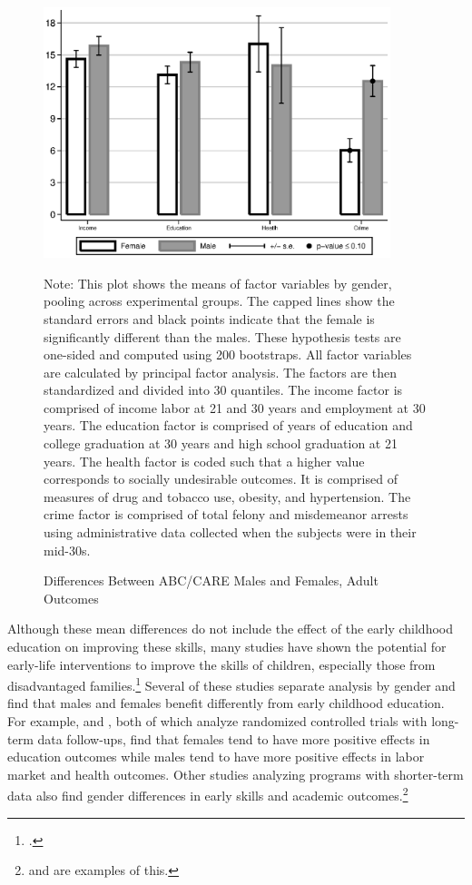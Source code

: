 \begin{figure}[H]
\begin{center}
\caption{Differences Between ABC/CARE Males and Females, Adult Outcomes}
\label{fig:intro-adult-outcomes}
	\includegraphics[width=0.9\textwidth]{../output/abccare-gdiff-adult}
\end{center}
\raggedright \scriptsize
Note: This plot shows the means of factor variables by gender, pooling across experimental groups. The capped lines show the standard errors and black points indicate that the female is significantly different than the males. These hypothesis tests are one-sided and computed using 200 bootstraps. All factor variables are calculated by principal factor analysis. The factors are then standardized and divided into 30 quantiles. The income factor is comprised of income labor at 21 and 30 years and employment at 30 years. The education factor is comprised of years of education and college graduation at 30 years and high school graduation at 21 years. The health factor is coded such that a higher value corresponds to socially undesirable outcomes. It is comprised of measures of drug and tobacco use, obesity, and hypertension. The crime factor is comprised of total felony and misdemeanor arrests using administrative data collected when the subjects were in their mid-30s.
\end{figure}

Although these mean differences do not include the effect of the early childhood education on improving these skills, many studies have shown the potential for early-life interventions to improve the skills of children, especially those from disadvantaged families.\footnote{\citet{Elango_Hojman_etal_2016_Early-Edu}.} Several of these studies separate analysis by gender and find that males and females benefit differently from early childhood education. For example, \citet{Heckman_Moon_etal_2010_QE} and \citet{Garcia_etal_2016_Comp_CBA_Unpublished}, both of which analyze randomized controlled trials with long-term data follow-ups, find that females tend to have more positive effects in education outcomes while males tend to have more positive effects in labor market and health outcomes. Other studies analyzing programs with shorter-term data also find gender differences in early skills and academic outcomes.\footnote{\citet{Deming_2009_AEJAE} and \citet{Ou_Reynolds_2010_Mechanisms_CYSR} are examples of this.} 


